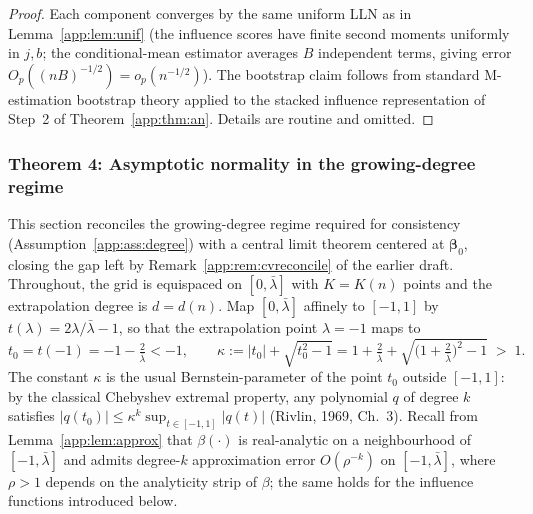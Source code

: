 \documentclass[11pt]{article}
\theoremstyle{plain}
\theoremstyle{definition}
\newcommand{\bet}{\bm{\beta}}
\begin{document}
\begin{proof}
Each component converges by the same uniform LLN as in
Lemma~\ref{app:lem:unif} (the influence scores have finite second moments
uniformly in $j,b$; the conditional-mean estimator averages $B$
independent terms, giving error $O_p((nB)^{-1/2})=o_p(n^{-1/2})$). The
bootstrap claim follows from standard M-estimation bootstrap theory
applied to the stacked influence representation of Step~2 of
Theorem~\ref{app:thm:an}. Details are routine and omitted.
\end{proof}

\subsubsection{Theorem 4: Asymptotic normality in the growing-degree regime}
\label{app:sec:growing}

This section reconciles the growing-degree regime required for
consistency (Assumption~\ref{app:ass:degree}) with a central limit theorem
centered at $\bet_0$, closing the gap left by Remark~\ref{app:rem:cvreconcile}
of the earlier draft. Throughout, the grid is equispaced on
$[0,\bar\lambda]$ with $K=K(n)$ points and the extrapolation degree is
$d=d(n)$. Map $[0,\bar\lambda]$ affinely to $[-1,1]$ by
$t(\lambda)=2\lambda/\bar\lambda-1$, so that the extrapolation point
$\lambda=-1$ maps to
\[
  t_0=t(-1)=-1-\tfrac{2}{\bar\lambda}<-1,
  \qquad
  \kappa:=|t_0|+\sqrt{t_0^2-1}
  =1+\tfrac{2}{\bar\lambda}
   +\sqrt{\bigl(1+\tfrac{2}{\bar\lambda}\bigr)^2-1}\;>\;1 .
\]
The constant $\kappa$ is the usual Bernstein-parameter of the point $t_0$
outside $[-1,1]$: by the classical Chebyshev extremal property, any
polynomial $q$ of degree $k$ satisfies
$|q(t_0)|\le\kappa^{k}\sup_{t\in[-1,1]}|q(t)|$
(Rivlin, 1969, Ch.~3). Recall from Lemma~\ref{app:lem:approx} that
$\beta(\cdot)$ is real-analytic on a neighbourhood of $[-1,\bar\lambda]$
and admits degree-$k$ approximation error $O(\rho^{-k})$ on
$[-1,\bar\lambda]$, where $\rho>1$ depends on the analyticity strip of
$\beta$; the same holds for the influence functions introduced below.
\end{document}
